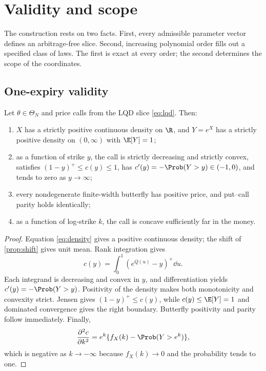 \section{Validity and scope}
\label{sec:validity}

The construction rests on two facts.  First, every admissible parameter
vector defines an arbitrage-free slice.  Second, increasing polynomial order
fills out a specified class of laws.  The first is exact at every order; the
second determines the scope of the coordinates.

\subsection{One-expiry validity}

\begin{proposition}
\label{prop:noarb}
Let $\theta\in\Theta_N$ and price calls from the LQD slice
\eqref{eq:lqd}.  Then:
\begin{enumerate}[label=(\roman*)]
\item $X$ has a strictly positive continuous density on $\R$, and
$Y=e^X$ has a strictly positive density on $(0,\infty)$ with $\E[Y]=1$;
\item as a function of strike $y$, the call is strictly decreasing and
strictly convex, satisfies $(1-y)^+\le c(y)\le1$, has
$c'(y)=-\Prob(Y>y)\in(-1,0)$, and tends to zero as $y\to\infty$;
\item every nondegenerate finite-width butterfly has positive price, and
put--call parity holds identically;
\item as a function of log-strike $k$, the call is concave sufficiently far
in the money.
\end{enumerate}
\end{proposition}

\begin{proof}
Equation \eqref{eq:density} gives a positive continuous density; the shift of
\cref{prop:shift} gives unit mean.  Rank integration gives
\[
c(y)=\int_0^1(e^{Q(u)}-y)^+\dd u.
\]
Each integrand is decreasing and convex in $y$, and differentiation yields
$c'(y)=-\Prob(Y>y)$.  Positivity of the density makes both monotonicity and
convexity strict.  Jensen gives $(1-y)^+\le c(y)$, while
$c(y)\le\E[Y]=1$ and dominated convergence gives the right boundary.
Butterfly positivity and parity follow immediately.  Finally,
\[
\frac{\partial^2c}{\partial k^2}
=e^k\{f_X(k)-\Prob(Y>e^k)\},
\]
which is negative as $k\to-\infty$ because $f_X(k)\to0$ and the probability
tends to one.
\end{proof}

